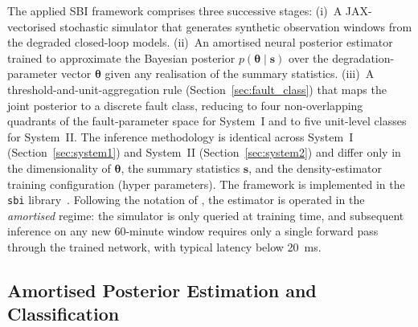 \documentclass[aps,pre,twocolumn,superscriptaddress]{revtex4-2}
\begin{document}
The applied SBI framework comprises three successive stages: (i)~A JAX-vectorised stochastic simulator that generates synthetic observation windows from the degraded closed-loop models. (ii)~An amortised neural posterior estimator trained to approximate the Bayesian posterior $p(\boldsymbol{\theta}\mid\mathbf{s})$ over the degradation-parameter vector $\boldsymbol{\theta}$ given any realisation of the summary statistics. (iii)~A threshold-and-unit-aggregation rule (Section~\ref{sec:fault_class}) that maps the joint posterior to a discrete fault class, reducing to four non-overlapping quadrants of the fault-parameter space for System~I and to five unit-level classes for System~II. The inference methodology is identical across System~I (Section~\ref{sec:system1}) and System~II
(Section~\ref{sec:system2}) and differ only in the dimensionality of $\boldsymbol{\theta}$, the summary statistics $\mathbf{s}$, and the density-estimator training configuration (hyper parameters).
The framework is implemented in the \texttt{sbi} library~\citep{Tejero_cantero_3be1efca,BoeltsDeistler_sbi_2025}.
Following the notation of \citet{Cranmer2020}, the estimator is operated in the \emph{amortised} regime: the simulator is only queried at training time, and subsequent
inference on any new 60-minute window requires only a single forward pass through the trained network, with typical latency below 20~ms.


\subsection{Amortised Posterior Estimation and Classification}
\label{sec:sbi_method}
\end{document}
